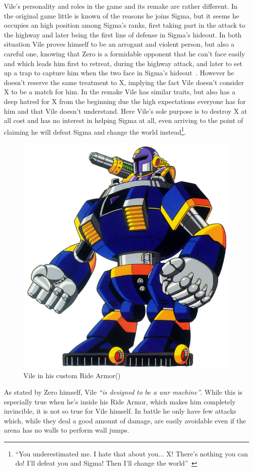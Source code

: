Vile's personality and roles in the \x game and its remake are rather different. In the original game little is known of the reasons he joins Sigma, but it seems he occupies an high position among Sigma's ranks, first taking part in the attack to the highway and later being the first line of defense in Sigma's hideout. In both situation Vile proves himself to be an arrogant and violent person, but also a careful one, knowing that Zero is a formidable opponent that he can't face easily and which leads him first to retreat, during the highway attack, and later to set up a trap to capture him when the two face in Sigma's hideout~\cite{wiki:Vile}.  However he doesn't reserve the same treatment to X, implying the fact Vile doesn't consider X to be a match for him. In the remake Vile has similar traits, but also has a deep hatred for X from the beginning due the high expectations everyone has for him and that Vile doesn't understand. Here Vile's sole purpose is to destroy X at all cost and has no interest in helping Sigma at all, even arriving to the point of claiming he will defeat Sigma and change the world instead\footnote{\enquote{You underestimated me. I hate that about you... X! There's nothing you can do! I'll defeat you and Sigma! Then I'll change the world}~\cite{wiki:MMX_script}}.
\begin{figure}[htp]
	\centering
	\includegraphics[width=0.35\linewidth]{figures/X1/Sigma_stages/VileRideArmor.jpg}
	\caption{Vile in his custom Ride Armor(\cite{book:MMX_Complete_art})}
\end{figure}

As stated by Zero himself, Vile \emph{``is designed to be a war machine''}. While this is especially true when he's inside his Ride Armor, which makes him completely invincible, it is not so true for Vile himself. In battle he only have few attacks which, while they deal a good amount of damage, are easily avoidable even if the arena has no walls to perform wall jumps.

